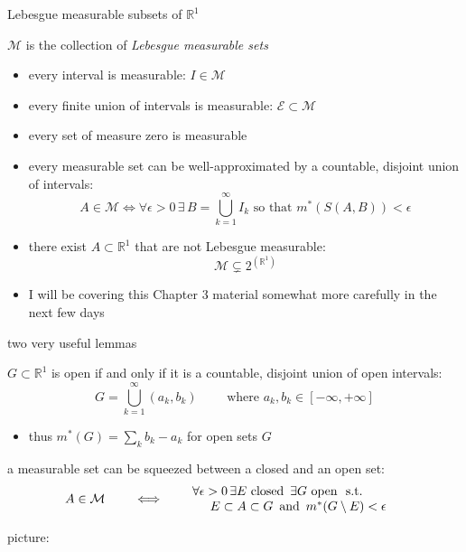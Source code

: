 \documentclass[10pt,
               svgnames,
               hyperref={colorlinks,
                         citecolor=DeepPink4,
                         linkcolor=FireBrick,
                         urlcolor=blue},
               usepdftitle=false]{beamer}
\newcommand{\cE}{\mathcal{E}}
\newcommand{\cM}{\mathcal{M}}
\newcommand{\RR}{\mathbb{R}}
\newcommand{\eps}{\epsilon}
\begin{document}
\begin{frame}{Lebesgue measurable subsets of $\RR^1$}

\begin{definition}
$\cM$ is the collection of \emph{Lebesgue measurable sets}
\end{definition}

\begin{itemize}
\item every interval is measurable: $I \in \cM$
\item every finite union of intervals is measurable: $\cE \subset \cM$
\item every set of measure zero is measurable
\item every measurable set can be well-approximated by a countable, disjoint union of intervals:
	$$A \in \cM \iff \forall \eps>0\, \exists\, B=\bigcup_{k=1}^\infty I_k \text{ so that } m^*(S(A,B))<\eps$$
\item<2> \alert{there exist $A\subset \RR^1$ that are not Lebesgue measurable}:
   $$\cM \subsetneq 2^{(\RR^1)}$$
\item<2> I will be covering this Chapter 3 material somewhat more carefully in the next few days
\end{itemize}
\end{frame}


\begin{frame}{two very useful lemmas}

\begin{lemma}
$G \subset \RR^1$ is open if and only if it is a countable, disjoint union of open intervals:
	$$G = \bigcup_{k=1}^\infty (a_k, b_k) \qquad \text{ where } a_k,b_k \in [-\infty,+\infty]$$
\end{lemma}

\begin{itemize}
\item thus $m^*(G) = \sum_{k} b_k - a_k$ for open sets $G$
\end{itemize}

\begin{lemma}
a measurable set can be squeezed between a closed and an open set:
	$$A \in \cM \qquad \iff \qquad \begin{matrix} \forall \eps>0 \, \exists E \text{ closed } \, \exists G \text{ open } \text{ s.t. } \hspace{10mm} \\ E \subset A \subset G\, \text{ and }\, m^*(G\setminus E)<\eps \end{matrix}$$
\end{lemma}

\noindent picture:

\vspace{13mm}
\end{frame}
\end{document}
